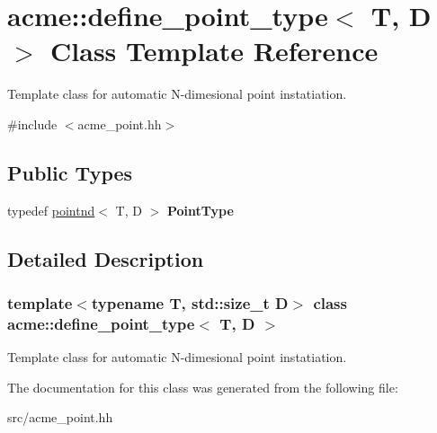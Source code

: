 \hypertarget{classacme_1_1define__point__type}{}\section{acme\+:\+:define\+\_\+point\+\_\+type$<$ T, D $>$ Class Template Reference}
\label{classacme_1_1define__point__type}


Template class for automatic N-\/dimesional point instatiation.  




{\ttfamily \#include $<$acme\+\_\+point.\+hh$>$}

\subsection*{Public Types}
\begin{DoxyCompactItemize}
\item 
\mbox{\label{classacme_1_1define__point__type_a6249a432e03176b959c0586b4cbdf40b}} 
typedef \hyperlink{classacme_1_1pointnd}{pointnd}$<$ T, D $>$ {\bfseries Point\+Type}
\end{DoxyCompactItemize}


\subsection{Detailed Description}
\subsubsection*{template$<$typename T, std\+::size\+\_\+t D$>$\newline
class acme\+::define\+\_\+point\+\_\+type$<$ T, D $>$}

Template class for automatic N-\/dimesional point instatiation. 

The documentation for this class was generated from the following file\+:\begin{DoxyCompactItemize}
\item 
src/acme\+\_\+point.\+hh\end{DoxyCompactItemize}

